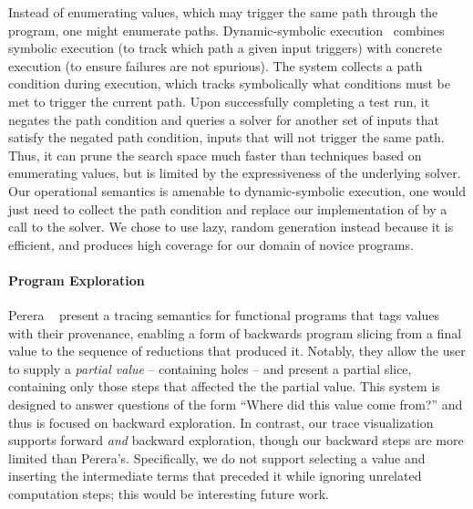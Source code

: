 Instead of enumerating values, which may trigger the same path through
the program, one might enumerate paths. 
%
Dynamic-symbolic execution~\cite{godefroid_dart:_2005,cadar_klee:_2008,tillmann_pex_2008}
%
combines symbolic execution (to track which path a given input
triggers) with concrete execution (to ensure failures are
not spurious). The system collects a path condition during execution,
which tracks symbolically what conditions must be met to trigger the
current path. Upon successfully completing a test run, it negates the
path condition and queries a solver for another set of inputs that
satisfy the negated path condition, \ie inputs that will not trigger the
same path. Thus, it can prune the search space
much faster than techniques based on enumerating values, but is limited
by the expressiveness of the underlying solver. Our operational
semantics is amenable to dynamic-symbolic execution, one would just need
to collect the path condition and replace our implementation of \gensym
by a call to the solver. We chose to use lazy, random generation instead
because it is efficient, and %
produces high coverage for our domain of novice programs.


\paragraph{Program Exploration}
Perera \etal~\cite{perera_functional_2012} present a tracing semantics
for functional programs that tags values with their provenance, enabling
a form of backwards program slicing from a final value to the sequence
of reductions that produced it. Notably, they allow the user to supply a
\emph{partial value} -- containing holes -- and present a partial slice,
containing only those steps that affected the the partial value. This
system is designed to answer questions of the form ``Where did this
value come from?'' and thus is focused on backward exploration. In
contrast, our trace visualization supports forward \emph{and} backward
exploration, though our backward steps are more limited than
Perera's. Specifically, we do not support selecting a value and
inserting the intermediate terms that preceded it while ignoring
unrelated computation steps; this would be interesting future work.


